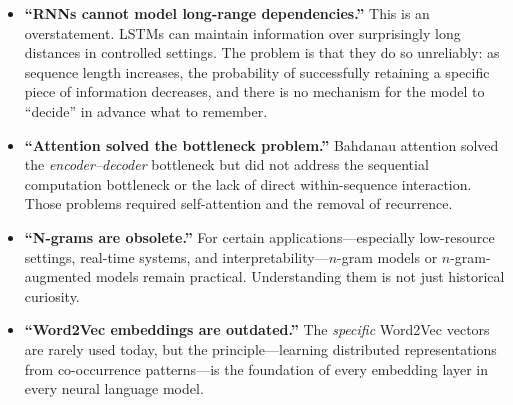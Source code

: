 \begin{itemize}
    \item \textbf{``RNNs cannot model long-range dependencies.''} This is an overstatement. LSTMs can maintain information over surprisingly long distances in controlled settings. The problem is that they do so unreliably: as sequence length increases, the probability of successfully retaining a specific piece of information decreases, and there is no mechanism for the model to ``decide'' in advance what to remember.

    \item \textbf{``Attention solved the bottleneck problem.''} Bahdanau attention solved the \emph{encoder--decoder} bottleneck but did not address the sequential computation bottleneck or the lack of direct within-sequence interaction. Those problems required self-attention and the removal of recurrence.

    \item \textbf{``N-grams are obsolete.''} For certain applications---especially low-resource settings, real-time systems, and interpretability---$n$-gram models or $n$-gram-augmented models remain practical. Understanding them is not just historical curiosity.

    \item \textbf{``Word2Vec embeddings are outdated.''} The \emph{specific} Word2Vec vectors are rarely used today, but the principle---learning distributed representations from co-occurrence patterns---is the foundation of every embedding layer in every neural language model.
\end{itemize}

